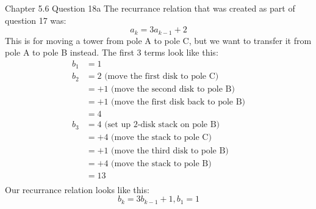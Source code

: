 \documentclass[11pt]{article}
\begin{document}
    \begin{problem}{Chapter 5.6 Question 18a}
        The recurrance relation that was created as part of question 17 was:
        \[a_k = 3a_{k-1}+2\]
        This is for moving a tower from pole A to pole C, but we want to transfer 
        it from pole A to pole B instead. The first 3 terms look like this:
        \begin{equation*}
            \begin{split}
                b_1 & = 1 \\
                b_2 & = 2 \text{ (move the first disk to pole C)} \\
                & = + 1 \text{ (move the second disk to pole B)} \\
                & = + 1 \text{ (move the first disk back to pole B)} \\
                & = 4 \\
                b_3 & = 4 \text{ (set up 2-disk stack on pole B)} \\
                & = + 4 \text{ (move the stack to pole C)} \\
                & = + 1 \text{ (move the third disk to pole B)} \\
                & = + 4 \text{ (move the stack to pole B)} \\
                & = 13 \\
            \end{split}
        \end{equation*}
        Our recurrance relation looks like this:
        \begin{equation*}
            b_k = 3b_{k-1} + 1, b_1 = 1
       \end{equation*}
    \end{problem}
\end{document}
